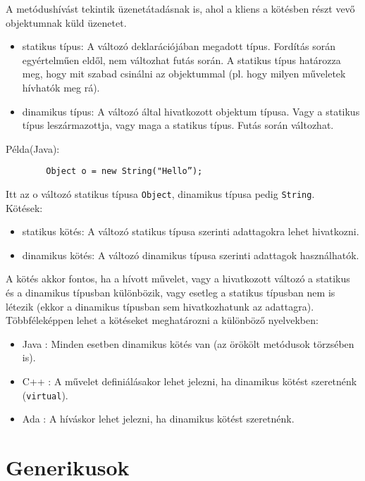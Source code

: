 \documentclass[margin=0px]{article}
\begin{document}
A metódushívást tekintik üzenetátadásnak is, ahol a kliens a kötésben részt vevő objektumnak küld üzenetet.

\begin{itemize}
    \item	statikus típus: A változó deklarációjában megadott típus. Fordítás során egyértelműen eldől, nem változhat
          futás során. A statikus típus határozza meg, hogy mit szabad csinálni az objektummal (pl. hogy milyen
          műveletek hívhatók meg rá).

    \item	dinamikus típus: A változó által hivatkozott objektum típusa. Vagy a statikus típus leszármazottja, vagy maga
          a statikus típus. Futás során változhat.
\end{itemize}

\noindent Példa(Java):
\begin{verbatim}
        Object o = new String("Hello”);
    \end{verbatim}
Itt az o változó statikus típusa \texttt{Object}, dinamikus típusa pedig \texttt{String}.\\

\noindent Kötések:
\begin{itemize}
    \item	statikus kötés: A változó statikus típusa szerinti adattagokra lehet hivatkozni.
    \item	dinamikus kötés: A változó dinamikus típusa szerinti adattagok használhatók.
\end{itemize}

A kötés akkor fontos, ha a hívott művelet, vagy a hivatkozott változó a statikus és a dinamikus típusban
különbözik, vagy esetleg a statikus típusban nem is létezik (ekkor a dinamikus típusban sem hivatkozhatunk
az adattagra).\\

\noindent Többféleképpen lehet a kötéseket meghatározni a különböző nyelvekben:
\begin{itemize}
    \item	Java : Minden esetben dinamikus kötés van (az örökölt metódusok törzsében is).
    \item	C++ : A művelet definiálásakor lehet jelezni, ha dinamikus kötést szeretnénk (\texttt{virtual}).
    \item	Ada : A híváskor lehet jelezni, ha dinamikus kötést szeretnénk.
\end{itemize}

\section{Generikusok}
\end{document}
